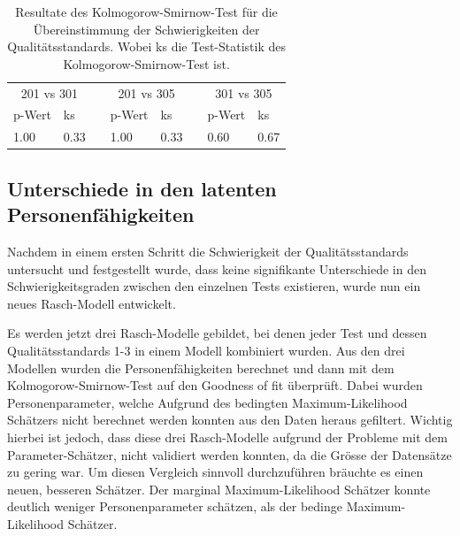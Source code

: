   \begin{table}[htbp]
    \centering
  \begin{tabular}{@{}llllllll@{}}
  \toprule
   \multicolumn{2}{c}{201 vs 301} &&  \multicolumn{2}{c}{201 vs 305}&&  \multicolumn{2}{c}{301 vs 305}\\ 
      \cmidrule{1-2} \cmidrule{4-5} \cmidrule{7-8}   
   p-Wert & ks && p-Wert & ks && p-Wert & ks  \\ 
  \midrule
    1.00 & 0.33 && 1.00 & 0.33 && 0.60 & 0.67  \\ 
  
  \bottomrule
  \end{tabular} 
    \caption{Resultate des Kolmogorow-Smirnow-Test für die Übereinstimmung der Schwierigkeiten der Qualitätsstandards. Wobei ks die Test-Statistik des Kolmogorow-Smirnow-Test ist.}
    \label{tab:corTestQ}
  \end{table}
  
  
  
\subsection{Unterschiede in den latenten Personenfähigkeiten}

Nachdem in einem ersten Schritt die Schwierigkeit der Qualitätsstandards untersucht und festgestellt wurde, dass keine signifikante Unterschiede in den Schwierigkeitsgraden zwischen den einzelnen Tests existieren, wurde nun ein neues Rasch-Modell entwickelt.

Es werden jetzt drei Rasch-Modelle gebildet, bei denen jeder Test und dessen Qualitätsstandards 1-3 in einem Modell kombiniert wurden. Aus den drei Modellen wurden die Personenfähigkeiten berechnet und dann mit dem Kolmogorow-Smirnow-Test auf den Goodness of fit überprüft. Dabei wurden Personenparameter, welche Aufgrund des bedingten Maximum-Likelihood Schätzers nicht berechnet werden konnten aus den Daten heraus gefiltert. Wichtig hierbei ist jedoch, dass diese drei Rasch-Modelle aufgrund der Probleme mit dem Parameter-Schätzer, nicht validiert werden konnten, da die Grösse der Datensätze zu gering war. Um diesen Vergleich sinnvoll durchzuführen bräuchte es einen neuen, besseren Schätzer. Der marginal Maximum-Likelihood Schätzer konnte deutlich weniger Personenparameter schätzen, als der bedinge Maximum-Likelihood Schätzer. 

